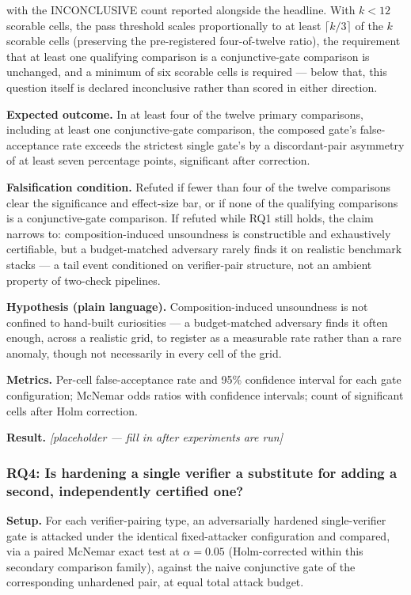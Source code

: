 \documentclass[11pt]{article}
\newcommand{\ph}{\textit{[placeholder --- fill in after experiments are run]}}
\begin{document}
with the INCONCLUSIVE count reported alongside the headline. With $k < 12$ scorable cells, the pass threshold scales proportionally to at least $\lceil k/3 \rceil$ of the $k$ scorable cells (preserving the pre-registered four-of-twelve ratio), the requirement that at least one qualifying comparison is a conjunctive-gate comparison is unchanged, and a minimum of six scorable cells is required --- below that, this question itself is declared inconclusive rather than scored in either direction.

\textbf{Expected outcome.} In at least four of the twelve primary comparisons, including at least one conjunctive-gate comparison, the composed gate's false-acceptance rate exceeds the strictest single gate's by a discordant-pair asymmetry of at least seven percentage points, significant after correction.

\textbf{Falsification condition.} Refuted if fewer than four of the twelve comparisons clear the significance and effect-size bar, or if none of the qualifying comparisons is a conjunctive-gate comparison. If refuted while RQ1 still holds, the claim narrows to: composition-induced unsoundness is constructible and exhaustively certifiable, but a budget-matched adversary rarely finds it on realistic benchmark stacks --- a tail event conditioned on verifier-pair structure, not an ambient property of two-check pipelines.

\textbf{Hypothesis (plain language).} Composition-induced unsoundness is not confined to hand-built curiosities --- a budget-matched adversary finds it often enough, across a realistic grid, to register as a measurable rate rather than a rare anomaly, though not necessarily in every cell of the grid.

\textbf{Metrics.} Per-cell false-acceptance rate and 95\% confidence interval for each gate configuration; McNemar odds ratios with confidence intervals; count of significant cells after Holm correction.

\textbf{Result.} \ph

\subsubsection{RQ4: Is hardening a single verifier a substitute for adding a second, independently certified one?}
\textbf{Setup.} For each verifier-pairing type, an adversarially hardened single-verifier gate is attacked under the identical fixed-attacker configuration and compared, via a paired McNemar exact test at $\alpha = 0.05$ (Holm-corrected within this secondary comparison family), against the naive conjunctive gate of the corresponding unhardened pair, at equal total attack budget.
\end{document}
